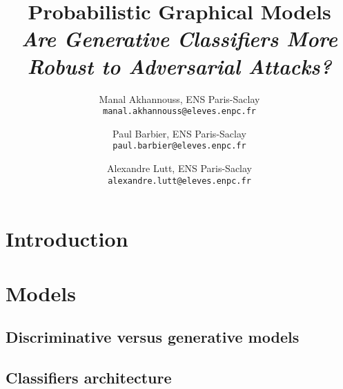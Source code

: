 \documentclass[10pt,twocolumn,letterpaper]{article}
\begin{document}
\title{Probabilistic Graphical Models \\ \textit{Are Generative Classiﬁers More Robust to Adversarial Attacks?}}

\author{Manal Akhannouss, ENS Paris-Saclay\\
{\tt\small manal.akhannouss@eleves.enpc.fr}
\and
Paul Barbier, ENS Paris-Saclay\\
{\tt\small paul.barbier@eleves.enpc.fr}
\and
Alexandre Lutt, ENS Paris-Saclay\\
{\tt\small alexandre.lutt@eleves.enpc.fr}
}
\maketitle


\section{Introduction}
\label{sec:intro}

\paragraph{} \cite{main_paper} 


\section{Models}
\label{sec:models}

\paragraph{}

\subsection{Discriminative versus generative models}

\paragraph{} 

\subsection{Classifiers architecture}

\paragraph{} 
\end{document}
